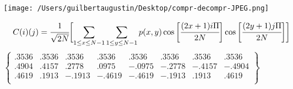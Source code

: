 \documentclass[12pt]{article}
\begin{document}
\paragraph{}
\texttt{[image: /Users/guilbertaugustin/Desktop/compr-decompr-JPEG.png]} %

	

\begin{equation*} 
C(i)(j)=\cfrac{1}{\sqrt{2N}} \biggl[\sum_{1\leq x\leq N-1} \sum_{1\leq y\leq N-1} p(x,y) \cos{\biggl[\cfrac{(2x+1) i \Pi}{2N}}\biggr] \cos{\biggl[\cfrac{(2y+1) j \Pi}{2N}}\biggr]\biggr]
\end{equation*}
$
\begin{Bmatrix}
.3536& .3536& .3536& .3536& .3536& .3536& .3536& .3536 \\
.4904& .4157& .2778& .0975& -.0975& -.2778& -.4157& -.4904 \\
.4619& .1913& -.1913& -.4619& -.4619& -.1913& .1913& .4619 \\
\end{Bmatrix}
$
\end{document}
